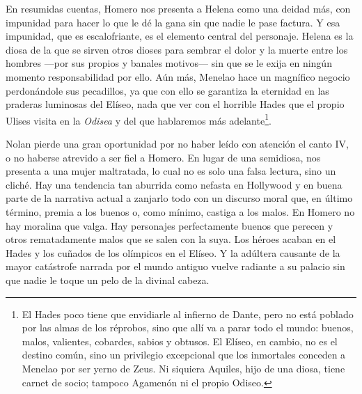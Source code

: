 En resumidas cuentas, Homero nos presenta a Helena como una deidad más, con impunidad para hacer lo que le dé la gana sin que nadie le pase factura. Y esa impunidad, que es escalofriante, es el elemento central del personaje. Helena es la diosa de la que se sirven otros dioses para sembrar el dolor y la muerte entre los hombres ---por sus propios y banales motivos--- sin que se le exija en ningún momento responsabilidad por ello. Aún más, Menelao hace un magnífico negocio perdonándole sus pecadillos, ya que con ello se garantiza la eternidad en las praderas luminosas del Elíseo, nada que ver con el horrible Hades que el propio Ulises visita en la \emph{Odisea} y del que hablaremos más adelante\footnote{El Hades poco tiene que envidiarle al infierno de Dante, pero no está poblado por las almas de los réprobos, sino que allí va a parar todo el mundo: buenos, malos, valientes, cobardes, sabios y obtusos. El Elíseo, en cambio, no es el destino común, sino un privilegio excepcional que los inmortales conceden a Menelao por ser yerno de Zeus. Ni siquiera Aquiles, hijo de una diosa, tiene carnet de socio; tampoco Agamenón ni el propio Odiseo.}.

Nolan pierde una gran oportunidad por no haber leído con atención el canto IV, o no haberse atrevido a ser fiel a Homero. En lugar de una semidiosa, nos presenta a una mujer maltratada, lo cual no es solo una falsa lectura, sino un cliché.
Hay una tendencia tan aburrida como nefasta en Hollywood y en buena parte de la narrativa actual a zanjarlo todo con un discurso moral que, en último término, premia a los buenos o, como mínimo, castiga a los malos. En Homero no hay moralina que valga. Hay personajes perfectamente buenos que perecen y otros rematadamente malos que se salen con la suya. Los héroes acaban en el Hades y los cuñados de los olímpicos en el Elíseo. Y la adúltera causante de la mayor catástrofe narrada por el mundo antiguo vuelve radiante a su palacio sin que nadie le toque un pelo de la divinal cabeza.
